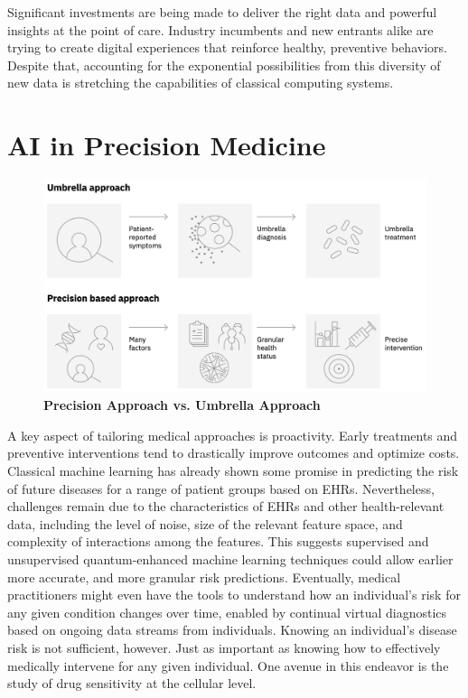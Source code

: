 \documentclass{scrartcl}
\begin{document}
Significant investments are being made to deliver the right data and powerful insights at the point of care. Industry incumbents and new entrants alike are trying to create digital experiences that reinforce healthy, preventive behaviors. Despite that, accounting for the exponential possibilities from this diversity of new data is stretching the capabilities of classical computing systems.

\section{AI in Precision Medicine}
\label{sec:org24635a9}

\begin{figure}[htbp]
\centering
\includegraphics[width=.9\linewidth]{./assets/precisionMedicineApproach.png}
\caption{\textbf{Precision Approach vs. Umbrella Approach}}
\end{figure}

A key aspect of tailoring medical approaches is proactivity. Early treatments and preventive interventions tend to drastically improve outcomes and optimize costs. Classical machine learning has already shown some promise in predicting the risk of future diseases for a range of patient groups based on EHRs. Nevertheless, challenges remain due to the characteristics of EHRs and other health-relevant data, including the level of noise, size of the relevant feature space, and complexity of interactions among the features. This suggests supervised and unsupervised quantum-enhanced machine learning techniques could allow earlier more accurate, and more granular risk predictions. Eventually, medical practitioners might even have the tools to understand how an individual’s risk for any given condition changes over time, enabled by continual virtual diagnostics based on ongoing data streams from individuals. Knowing an individual’s disease risk is not sufficient, however. Just as important as knowing how to effectively medically intervene for any given individual. One avenue in this endeavor is the study of drug sensitivity at the cellular level.
\end{document}
